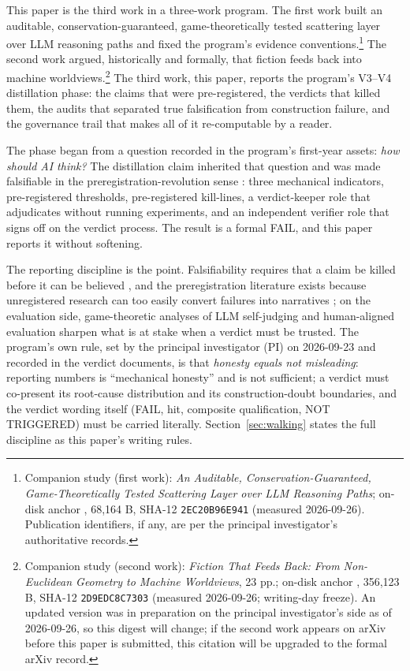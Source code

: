\documentclass[11pt]{article}
\newcommand{\sha}[1]{\texttt{#1}}
\begin{document}
This paper is the third work in a three-work program. The first work built an auditable, conservation-guaranteed, game-theoretically tested scattering layer over LLM reasoning paths and fixed the program's evidence conventions.\footnote{Companion study (first work): \emph{An Auditable, Conservation-Guaranteed, Game-Theoretically Tested Scattering Layer over LLM Reasoning Paths}; on-disk anchor , 68{,}164 B, SHA-12 \sha{2EC20B96E941} (measured 2026-09-26). Publication identifiers, if any, are per the principal investigator's authoritative records.} The second work argued, historically and formally, that fiction feeds back into machine worldviews.\footnote{Companion study (second work): \emph{Fiction That Feeds Back: From Non-Euclidean Geometry to Machine Worldviews}, 23 pp.; on-disk anchor , 356{,}123 B, SHA-12 \sha{2D9EDC8C7303} (measured 2026-09-26; writing-day freeze). An updated version was in preparation on the principal investigator's side as of 2026-09-26, so this digest will change; if the second work appears on arXiv before this paper is submitted, this citation will be upgraded to the formal arXiv record.} The third work, this paper, reports the program's V3--V4 distillation phase: the claims that were pre-registered, the verdicts that killed them, the audits that separated true falsification from construction failure, and the governance trail that makes all of it re-computable by a reader.

The phase began from a question recorded in the program's first-year assets: \emph{how should AI think?} The distillation claim inherited that question and was made falsifiable in the preregistration-revolution sense \cite{nosek2018}: three mechanical indicators, pre-registered thresholds, pre-registered kill-lines, a verdict-keeper role that adjudicates without running experiments, and an independent verifier role that signs off on the verdict process. The result is a formal FAIL, and this paper reports it without softening.

The reporting discipline is the point. Falsifiability requires that a claim be killed before it can be believed \cite{popper1959}, and the preregistration literature exists because unregistered research can too easily convert failures into narratives \cite{nosek2018}; on the evaluation side, game-theoretic analyses of LLM self-judging and human-aligned evaluation \cite{yang2025} sharpen what is at stake when a verdict must be trusted. The program's own rule, set by the principal investigator (PI) on 2026-09-23 and recorded in the verdict documents, is that \emph{honesty equals not misleading}: reporting numbers is ``mechanical honesty'' and is not sufficient; a verdict must co-present its root-cause distribution and its construction-doubt boundaries, and the verdict wording itself (FAIL, hit, composite qualification, NOT TRIGGERED) must be carried literally. Section~\ref{sec:walking} states the full discipline as this paper's writing rules.
\end{document}
